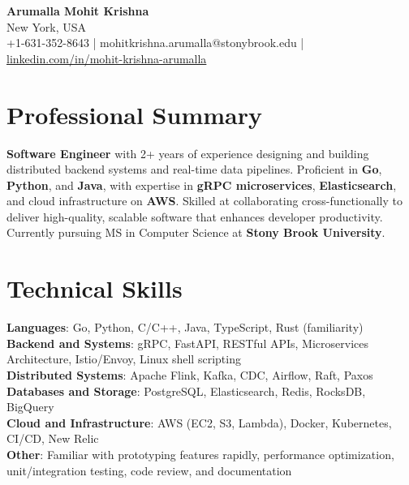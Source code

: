 \documentclass[letterpaper,11pt]{article}
\begin{document}
\begin{center}
  {\Large \textbf{Arumalla Mohit Krishna}} \\
  New York, USA \\
  +1-631-352-8643 \enspace | \enspace mohitkrishna.arumalla@stonybrook.edu \enspace | \enspace \href{https://www.linkedin.com/in/mohit-krishna-arumalla}{linkedin.com/in/mohit-krishna-arumalla}
\end{center}

\section{Professional Summary}
  \begin{itemize}[leftmargin=0.15in, label={}]
    \small{\item{
     \textbf{Software Engineer} with 2+ years of experience designing and building distributed backend systems and real-time data pipelines. Proficient in \textbf{Go}, \textbf{Python}, and \textbf{Java}, with expertise in \textbf{gRPC microservices}, \textbf{Elasticsearch}, and cloud infrastructure on \textbf{AWS}. Skilled at collaborating cross-functionally to deliver high-quality, scalable software that enhances developer productivity. Currently pursuing MS in Computer Science at \textbf{Stony Brook University}.
    }}
  \end{itemize}
\vspace{-16pt}

\section{Technical Skills}
 \begin{itemize}[leftmargin=0.15in, label={}]
    \small{\item{
     \textbf{Languages}: Go, Python, C/C++, Java, TypeScript, Rust (familiarity) \\
     \textbf{Backend and Systems}: gRPC, FastAPI, RESTful APIs, Microservices Architecture, Istio/Envoy, Linux shell scripting \\
     \textbf{Distributed Systems}: Apache Flink, Kafka, CDC, Airflow, Raft, Paxos \\
     \textbf{Databases and Storage}: PostgreSQL, Elasticsearch, Redis, RocksDB, BigQuery \\
     \textbf{Cloud and Infrastructure}: AWS (EC2, S3, Lambda), Docker, Kubernetes, CI/CD, New Relic \\
     \textbf{Other}: Familiar with prototyping features rapidly, performance optimization, unit/integration testing, code review, and documentation
    }}
 \end{itemize}
\vspace{-16pt}
\end{document}
